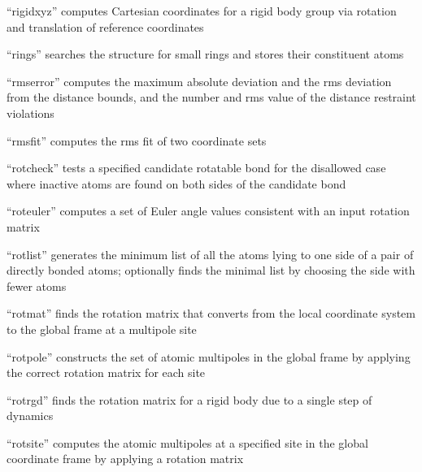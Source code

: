 \documentclass[letterpaper,11pt,english]{sphinxmanual}
\begin{document}
“rigidxyz” computes Cartesian coordinates for a rigid body group via rotation and translation of reference coordinates


“rings” searches the structure for small rings and stores their constituent atoms


“rmserror” computes the maximum absolute deviation and the rms deviation from the distance bounds, and the number and rms value of the distance restraint violations


“rmsfit” computes the rms fit of two coordinate sets



“rotcheck” tests a specified candidate rotatable bond for the disallowed case where inactive atoms are found on both sides of the candidate bond


“roteuler” computes a set of Euler angle values consistent with an input rotation matrix


“rotlist” generates the minimum list of all the atoms lying to one side of a pair of directly bonded atoms; optionally finds the minimal list by choosing the side with fewer atoms


“rotmat” finds the rotation matrix that converts from the local coordinate system to the global frame at a multipole site


“rotpole” constructs the set of atomic multipoles in the global frame by applying the correct rotation matrix for each site


“rotrgd” finds the rotation matrix for a rigid body due to a single step of dynamics


“rotsite” computes the atomic multipoles at a specified site in the global coordinate frame by applying a rotation matrix
\end{document}
